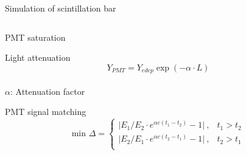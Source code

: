\documentclass[compress, 13pt, aspectratio=169]{beamer}
\begin{document}
\begin{frame}{Simulation of scintillation bar}
\begin{columns}
\begin{column}{0.5\textwidth}
\begin{block}{\small PMT saturation\footnotemark}
\begin{figure}[t]
                \end{figure}
            \end{block}
            \pause
            \vspace*{-0.2cm}
            \begin{block}{\small Light attenuation}
            \vspace*{-0.2cm}
            {
                \small$$Y_{PMT} = Y_{edep} \exp (-\alpha \cdot L)$$
            }
            \vspace*{-0.7cm}\\
            {\footnotesize$\alpha$: Attenuation factor}
            \end{block}
            \pause
            \vspace*{-0.2cm}
            \begin{block}{\small PMT signal matching}
            {
                \small
                \vspace*{-0.5cm}
                $$\text{min }\Delta = 
                \begin{cases}
                    \lvert E_1/E_2 \cdot e^{\alpha c (t_1-t_2)} -1\rvert\ ,& t_1>t_2\\
                    \lvert E_2/E_1 \cdot e^{\alpha c (t_2-t_1)} -1\rvert\ ,& t_2>t_1\\
                \end{cases}$$
            }
            \end{block}
        \end{column}
    \end{columns}
\end{frame}
\end{document}

